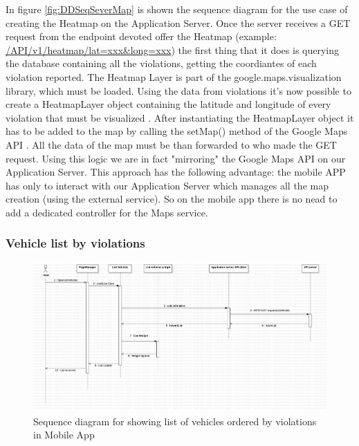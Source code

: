 In figure \ref{fig:DDSeqSeverMap} is shown the sequence diagram for the use case of creating the Heatmap on the Application Server.
Once the server receives a GET request from the endpoint devoted offer the Heatmap (example: \url{/API/v1/heatmap/lat=xxx&long=xxx}) the first thing that it does is querying the database containing all the violations, getting the coordiantes of each violation reported. The Heatmap Layer is part of the \textcolor{poliblue}{google.maps.visualization} library, which must be loaded. Using the data from violations it's now possible to create a \textcolor{poliblue}{HeatmapLayer} object containing the latitude and longitude of every violation that must be visualized \cite{GMapsHeat}. After instantiating the \textcolor{poliblue}{HeatmapLayer} object it has to be added to the map by calling the \textcolor{poliblue}{setMap()} method of the Google Maps API \cite{GMapsHeat}. All the data of the map must be than forwarded to who made the GET request.
Using this logic we are in fact "mirroring" the Google Maps API on our Application Server. This approach has the following advantage: the mobile APP has only to interact with our Application Server which manages all the map creation (using the external service). So on the mobile app there is no nead to add a dedicated controller for the Maps service.

\subsubsection{Vehicle list by violations}%
\begin{figure}[H]
\centering
\includegraphics[width=\textwidth]{Images/DDSeqAppList.png}
\caption{\label{fig:DDSeqAppList} Sequence diagram for showing list of vehicles ordered by violations in Mobile App }
\end{figure}

